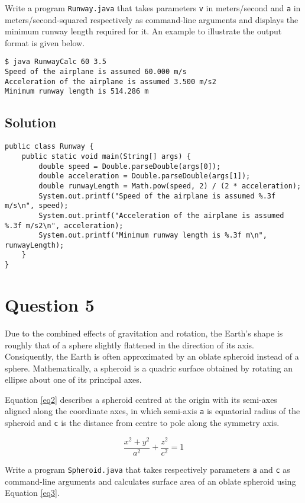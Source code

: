 Write a program \texttt{Runway.java} that takes parameters \texttt{v} in meters/second and \texttt{a} in meters/second-squared respectively as command-line arguments and displays the minimum runway length required for it. An example to illustrate the output format is given below.

\begin{verbatim}
$ java RunwayCalc 60 3.5
Speed of the airplane is assumed 60.000 m/s
Acceleration of the airplane is assumed 3.500 m/s2
Minimum runway length is 514.286 m
\end{verbatim}

\subsection*{Solution}
\lstset{language=Java,tabsize=2}
\begin{lstlisting}
public class Runway {
	public static void main(String[] args) {
		double speed = Double.parseDouble(args[0]);
		double acceleration = Double.parseDouble(args[1]);
		double runwayLength = Math.pow(speed, 2) / (2 * acceleration);
		System.out.printf("Speed of the airplane is assumed %.3f m/s\n", speed);
		System.out.printf("Acceleration of the airplane is assumed %.3f m/s2\n", acceleration);
		System.out.printf("Minimum runway length is %.3f m\n", runwayLength);
	}
}
\end{lstlisting}

\section*{Question 5}
Due to the combined effects of gravitation and rotation, the Earth's shape is roughly that of a sphere slightly flattened in the direction of its axis. Consiquently, the Earth is often approximated by an oblate spheroid instead of a sphere. Mathematically, a spheroid is a quadric surface obtained by rotating an ellipse about one of its principal axes.

Equation \ref{eq2} describes a spheroid centred at the origin with its semi-axes aligned along the coordinate axes, in which semi-axis \texttt{a} is equatorial radius of the spheroid and \texttt{c} is the distance from centre to pole along the symmetry axis.

\begin{equation}
\frac{x^2+y^2}{a^2} + \frac{z^2}{c^2} = 1
\label{eq2}
\end{equation}

Write a program \texttt{Spheroid.java} that takes respectively parameters \texttt{a} and \texttt{c} as command-line arguments and calculates surface area of an oblate spheroid using Equation \ref{eq3}.

